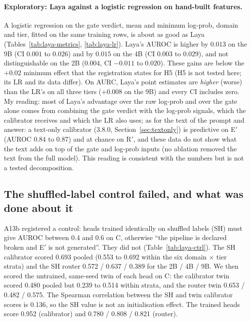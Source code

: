 \documentclass[11pt,a4paper]{article}
\begin{document}
\paragraph{Exploratory: Laya against a logistic regression on hand-built features.} A logistic regression on the gate verdict, mean and
minimum log-prob, domain and tier, fitted on the same training rows, is about as good as Laya (Tables~\ref{tab:laya-metrics}, \ref{tab:laya-lr}).
Laya's AUROC is higher by $0.013$ on the 9B (CI $0.001$ to $0.026$) and by $0.015$ on the 4B (CI $0.003$ to $0.029$), and not distinguishable on the 2B
($0.004$, CI $-0.011$ to $0.020$). These gains are below the $+0.02$ minimum effect that the registration states for H5 (H5 is not tested here; its LR and
its data differ). On AURC, Laya's point estimates are \emph{higher} (worse) than the LR's on all three tiers ($+0.008$ on the 9B) and every CI includes zero.
My reading: most of Laya's advantage over the raw log-prob and over the gate alone comes from combining the gate verdict with the log-prob signals, which the
calibrator receives and which the LR also uses; as for the text of the prompt and answer: a text-only calibrator (3.8.0, Section~\ref{sec:textonly}) is predictive on E$'$ (AUROC 0.84 to 0.87) and at chance on R$'$, and these data do not show what the text adds on top of the gate and log-prob inputs (no ablation removed the text from the full model). This reading is consistent with the numbers but is not a tested decomposition.

\subsection{The shuffled-label control failed, and what was done about it}\label{sec:laya-ctrl}

A13b registered a control: heads trained identically on shuffled labels (SH) must give AUROC between 0.4 and 0.6 on C, otherwise ``the
pipeline is declared broken and E$'$ is not generated''. They did not (Table~\ref{tab:laya-ctrl}). The SH calibrator scored 0.693 pooled
(0.553 to 0.692 within the six domain $\times$ tier strata) and the SH router 0.572 / 0.637 / 0.389 for the 2B / 4B / 9B. We then scored the untrained, same-seed twin of
each head on C: the calibrator twin scored 0.480 pooled but 0.239 to 0.514 within strata, and the router twin 0.653 / 0.482 / 0.575. The Spearman correlation between the SH and twin
calibrator scores is 0.136, so the SH value is not an initialisation effect. The trained heads score 0.952 (calibrator) and 0.780 / 0.808 / 0.821 (router).
\end{document}
